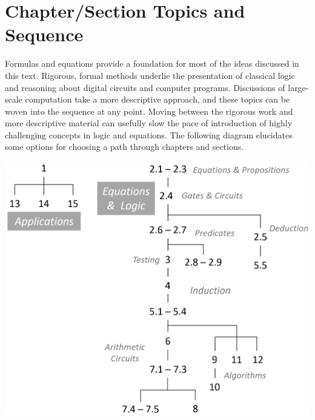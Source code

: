 \chapter{Chapter/Section Topics and Sequence}
\label{ch:roadmap}

Formulas and equations provide a foundation
for most of the ideas discussed in this text.
Rigorous, formal methods underlie the presentation of classical logic
and reasoning about digital circuits and computer programs.
Discussions of large-scale computation take a more descriptive approach,
and these topics can be woven into the sequence at any point.
Moving between the rigorous work and more descriptive material
can usefully slow the pace of introduction 
of highly challenging concepts in logic and equations.
The following diagram elucidates some options for choosing a
path through chapters and sections.
\vspace{1cm}
\label{diagram:roadmap}
\begin{center}
\includegraphics[scale=0.25]{images/roadmap.png}
\end{center}


